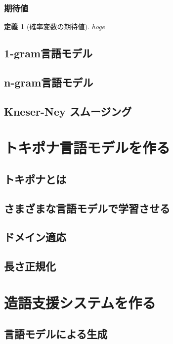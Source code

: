 \documentclass[11pt]{report}
\newtheorem{definition}[theorem]{定義}
\begin{document}
\subsection{期待値}

\begin{definition}[確率変数の期待値]
	hoge
\end{definition}

\section{1-gram言語モデル}

\section{n-gram言語モデル}

\section{Kneser-Ney スムージング}

\chapter{トキポナ言語モデルを作る}

\section{トキポナとは}

\section{さまざまな言語モデルで学習させる}

\section{ドメイン適応}

\section{長さ正規化}

\chapter{造語支援システムを作る}

\section{言語モデルによる生成}
\end{document}
